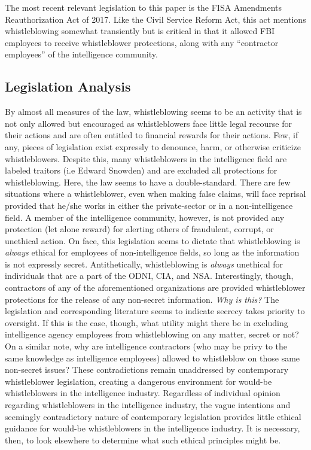 \documentclass [12 pt] {article}
\begin{document}
\bigbreak
The most recent relevant legislation to this paper is the FISA Amendments Reauthorization Act of 2017. Like the Civil Service Reform Act, this act mentions whistleblowing somewhat transiently but is critical in that it allowed FBI employees to receive whistleblower protections, along with any ``contractor employees'' of the intelligence community.
\subsection {Legislation Analysis}
By almost all measures of the law, whistleblowing seems to be an activity that is not only allowed but encouraged as whistleblowers face little legal recourse for their actions and are often entitled to financial rewards for their actions. Few, if any, pieces of legislation exist expressly to denounce, harm, or otherwise criticize whistleblowers. Despite this, many whistleblowers in the intelligence field are labeled traitors (i.e Edward Snowden) and are excluded all protections for whistleblowing. Here, the law seems to have a double-standard. There are few situations where a whistleblower, even when making false claims, will face reprisal provided that he/she works in either the private-sector or in a non-intelligence field. A member of the intelligence community, however, is not provided any protection (let alone reward) for alerting others of fraudulent, corrupt, or unethical action. On face, this legislation seems to dictate that whistleblowing is \textit{always} ethical for employees of non-intelligence fields, so long as the information is not expressly secret. Antithetically, whistleblowing is \textit{always} unethical for individuals that are a part of the ODNI, CIA, and NSA. Interestingly, though, contractors of any of the aforementioned organizations are provided whistleblower protections for the release of any non-secret information. \textit{Why is this?}
\bigbreak
The legislation and corresponding literature seems to indicate secrecy takes priority to oversight. If this is the case, though, what utility might there be in excluding intelligence agency employees from whistleblowing on any matter, secret or not? On a similar note, why are intelligence contractors (who may be privy to the same knowledge as intelligence employees) allowed to whistleblow on those same non-secret issues? These contradictions remain unaddressed by contemporary whistleblower legislation, creating a dangerous environment for would-be whistleblowers in the intelligence industry. Regardless of individual opinion regarding whistleblowers in the intelligence industry, the vague intentions and seemingly contradictory nature of contemporary legislation provides little ethical guidance for would-be whistleblowers in the intelligence industry. It is necessary, then, to look elsewhere to determine what such ethical principles might be.
\end{document}
